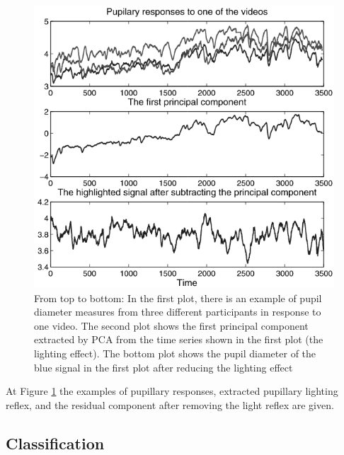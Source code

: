 \documentclass[10pt,journal,compsoc,twoside]{IEEEtran}
\newcommand{\Ref}[2]{#2 \ref{#1}}
\begin{document}
\begin{figure}[ht]
	\centering
	\includegraphics[width=1.0\linewidth]{pupilDiameter2}
	\caption{
		From top to bottom: In the first plot, there is an example of pupil diameter measures from three different participants in response to one video. The second plot shows the first principal component extracted by PCA from the time series shown in the first plot (the lighting effect). The bottom plot shows the pupil diameter of the blue signal in the first plot after reducing the lighting effect\cite{SoleymaniPanticPun2002}}
	\label{fig:pupilDiameter2}
\end{figure}

At \Ref{fig:pupilDiameter2}{Figure} the examples of pupillary responses, extracted pupillary lighting reflex, and the residual component after removing the light reflex are given.
\subsection{Classification}
\end{document}
